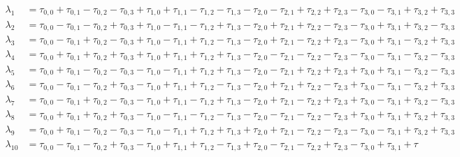 \documentclass[11pt,dvipsnames]{article} %
\newcommand{\1}{\mathds{1}}
\begin{document}
\begin{align}
\lambda_{1}&=
 \tau _{0,0}+\tau _{0,1}-\tau _{0,2}-\tau _{0,3}+\tau _{1,0}+\tau _{1,1}-\tau _{1,2}-\tau
   _{1,3}-\tau _{2,0}-\tau _{2,1}+\tau _{2,2}+\tau _{2,3}-\tau _{3,0}-\tau _{3,1}+\tau
   _{3,2}+\tau _{3,3} \nonumber \\
\lambda_{2}&=   
 \tau _{0,0}-\tau _{0,1}-\tau _{0,2}+\tau _{0,3}+\tau _{1,0}-\tau _{1,1}-\tau _{1,2}+\tau
   _{1,3}-\tau _{2,0}+\tau _{2,1}+\tau _{2,2}-\tau _{2,3}-\tau _{3,0}+\tau _{3,1}+\tau
   _{3,2}-\tau _{3,3} \nonumber \\
\lambda_{3}&=
 \tau _{0,0}-\tau _{0,1}+\tau _{0,2}-\tau _{0,3}+\tau _{1,0}-\tau _{1,1}+\tau _{1,2}-\tau
   _{1,3}-\tau _{2,0}+\tau _{2,1}-\tau _{2,2}+\tau _{2,3}-\tau _{3,0}+\tau _{3,1}-\tau
   _{3,2}+\tau _{3,3} \nonumber \\
\lambda_{4}&=
 \tau _{0,0}+\tau _{0,1}+\tau _{0,2}+\tau _{0,3}+\tau _{1,0}+\tau _{1,1}+\tau _{1,2}+\tau
   _{1,3}-\tau _{2,0}-\tau _{2,1}-\tau _{2,2}-\tau _{2,3}-\tau _{3,0}-\tau _{3,1}-\tau
   _{3,2}-\tau _{3,3}\nonumber \\
\lambda_{5}&=
 \tau _{0,0}+\tau _{0,1}-\tau _{0,2}-\tau _{0,3}-\tau _{1,0}-\tau _{1,1}+\tau _{1,2}+\tau
   _{1,3}-\tau _{2,0}-\tau _{2,1}+\tau _{2,2}+\tau _{2,3}+\tau _{3,0}+\tau _{3,1}-\tau
   _{3,2}-\tau _{3,3}\nonumber \\
\lambda_{6}&=
 \tau _{0,0}-\tau _{0,1}-\tau _{0,2}+\tau _{0,3}-\tau _{1,0}+\tau _{1,1}+\tau _{1,2}-\tau
   _{1,3}-\tau _{2,0}+\tau _{2,1}+\tau _{2,2}-\tau _{2,3}+\tau _{3,0}-\tau _{3,1}-\tau
   _{3,2}+\tau _{3,3}\nonumber \\
\lambda_{7}&=
 \tau _{0,0}-\tau _{0,1}+\tau _{0,2}-\tau _{0,3}-\tau _{1,0}+\tau _{1,1}-\tau _{1,2}+\tau
   _{1,3}-\tau _{2,0}+\tau _{2,1}-\tau _{2,2}+\tau _{2,3}+\tau _{3,0}-\tau _{3,1}+\tau
   _{3,2}-\tau _{3,3}\nonumber \\
\lambda_{8}&=   
 \tau _{0,0}+\tau _{0,1}+\tau _{0,2}+\tau _{0,3}-\tau _{1,0}-\tau _{1,1}-\tau _{1,2}-\tau
   _{1,3}-\tau _{2,0}-\tau _{2,1}-\tau _{2,2}-\tau _{2,3}+\tau _{3,0}+\tau _{3,1}+\tau
   _{3,2}+\tau _{3,3}\nonumber \\
\lambda_{9}&=   
 \tau _{0,0}+\tau _{0,1}-\tau _{0,2}-\tau _{0,3}-\tau _{1,0}-\tau _{1,1}+\tau _{1,2}+\tau
   _{1,3}+\tau _{2,0}+\tau _{2,1}-\tau _{2,2}-\tau _{2,3}-\tau _{3,0}-\tau _{3,1}+\tau
   _{3,2}+\tau _{3,3}\nonumber \\
\lambda_{10}&=   
 \tau _{0,0}-\tau _{0,1}-\tau _{0,2}+\tau _{0,3}-\tau _{1,0}+\tau _{1,1}+\tau _{1,2}-\tau
   _{1,3}+\tau _{2,0}-\tau _{2,1}-\tau _{2,2}+\tau _{2,3}-\tau _{3,0}+\tau _{3,1}+\tau

\end{align}
\end{document}
